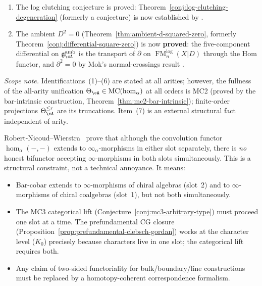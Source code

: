 \begin{remark}
\begin{enumerate}[label=\textup{(\arabic*)}]
  (Construction~\ref{constr:arity4-degeneration}).
\item The log clutching conjecture is proved:
  Theorem~\ref{conj:log-clutching-degeneration} (formerly a
  conjecture) is now established by \cite[Corollary~5.3.4]{Mok25}.
\item The ambient $D^2 = 0$
  (Theorem~\ref{thm:ambient-d-squared-zero}, formerly
  Theorem~\ref{conj:differential-square-zero}) is now
  \textbf{proved}: the five-component differential on
  $\mathfrak{g}^{\mathrm{amb}}_{\cA}$ is the transport of
  $\partial$ on $\operatorname{FM}_n^{\mathrm{log}}(X|D)$
  through the Hom functor, and $\partial^2 = 0$ by Mok's
  normal-crossings result \cite[Theorem~3.3.1(1)]{Mok25}.
\end{enumerate}
\emph{Scope note.}  Identifications~(1)--(6) are stated at all
arities; however, the fullness of the all-arity unification
$\Theta_\cA \in \mathrm{MC}(\operatorname{hom}_\alpha)$ at all orders
is MC2 (proved by the bar-intrinsic construction,
Theorem~\ref{thm:mc2-bar-intrinsic}); finite-order projections
$\Theta_\cA^{\leq r}$ are its truncations.  Item~(7) is an external structural
fact independent of arity.
\end{remark}

\begin{remark}
\label{rem:no-bifunctor}
Robert-Nicoud--Wierstra~\cite[Section~6]{RNW19} prove that although
the convolution functor $\operatorname{hom}_\alpha(-,-)$ extends to
$\infty_\alpha$-morphisms in either slot separately, there is
\emph{no} honest bifunctor accepting $\infty$-morphisms in both slots
simultaneously.  This is a structural constraint, not a technical
annoyance.  It means:
\begin{itemize}
\item Bar-cobar extends to $\infty$-morphisms of chiral algebras (slot~2)
  and to $\infty$-morphisms of chiral coalgebras (slot~1), but not both
  simultaneously.
\item The MC3 categorical lift
  (Conjecture~\ref{conj:mc3-arbitrary-type}) must proceed one slot at a
  time.  The prefundamental CG closure
  (Proposition~\ref{prop:prefundamental-clebsch-gordan}) works at the
  character level ($K_0$) precisely because characters live in one slot;
  the categorical lift requires both.
\item Any claim of two-sided functoriality for bulk/boundary/line
  constructions must be replaced by a homotopy-coherent correspondence
  formalism.
\end{itemize}
\end{remark}

